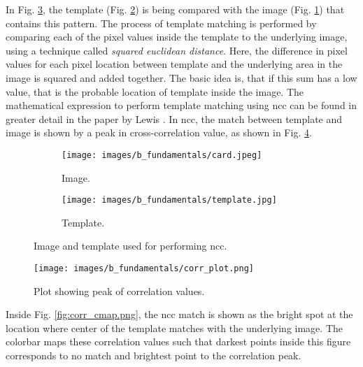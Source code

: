    \vspace{5mm}
    \noindent In Fig. \ref{fig:ncc_example}, the template (Fig. \ref{subfig:template.jpg}) is being compared with the image (Fig. \ref{subfig:card.jpg}) that contains this pattern. The process of template matching is performed by comparing each of the pixel values inside the template to the underlying image, using a technique called \emph{squared euclidean distance}. Here, the difference in pixel values for each pixel location between template and the underlying area in the image is squared and added together. The basic idea is, that if this sum has a low value, that is the probable location of template inside the image. The mathematical expression to perform template matching using \gls{ncc} can be found in greater detail in the paper by Lewis \cite{lewis}. In \gls{ncc}, the match between template and image is shown by a peak in cross-correlation value, as shown in Fig. \ref{fig:corr_plot.png}.

    \begin{figure}[h]
        \begin{subfigure}[b]{0.5\textwidth}
            \centering
            \texttt{[image: images/b\_fundamentals/card.jpeg]}
            \caption{Image.}
            \label{subfig:card.jpg}
        \end{subfigure}
        \begin{subfigure}[b]{0.5\textwidth}
            \centering
            \texttt{[image: images/b\_fundamentals/template.jpg]}
            \caption{Template.}
            \label{subfig:template.jpg}
        \end{subfigure}
        \caption{Image and template used for performing \gls{ncc}. \cite{img_card}}
        \label{fig:ncc_example}
    \end{figure}

    \begin{figure}[h]
        \centering
        \texttt{[image: images/b\_fundamentals/corr\_plot.png]}
        \caption{Plot showing peak of correlation values.}
        \label{fig:corr_plot.png}
    \end{figure}

    \clearpage
    
    \noindent Inside Fig. \ref{fig:corr_cmap.png}, the \gls{ncc} match is shown as the bright spot at the location where center of the template matches with the underlying image. The colorbar maps these correlation values such that darkest points inside this figure corresponds to no match and brightest point to the correlation peak.
    
